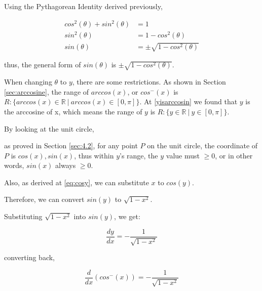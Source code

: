 \documentclass[12pt, titlepage]{article}
\begin{document}
    Using the Pythagorean Identity derived previously,
    \begin{center}
        \begin{align}
            cos^2(\theta)+sin^2(\theta)&=1\\
            sin^2(\theta)&=1-cos^2(\theta)\\
            sin(\theta)&=\pm\sqrt{1-cos^2(\theta)}
        \end{align}
    \end{center}
    thus, the general form of $sin(\theta)$ is $\pm\sqrt{1-cos^2(\theta)}$.
    
    When changing $\theta$ to $y$, there are some restrictions. As shown in Section \ref{sec:arccosine}, the range of $arccos(x)$, or $cos^-(x)$ is $R: \{arccos(x)\in\mathbb{R}\:|\:arccos(x)\in [0, \pi]\}$. At 
    \eqref{yisarccosin} we found that $y$ is the arccosine of x, which means the range of $y$ is $R: \{y\in\mathbb{R}\:|\:y\in [0, \pi]\}$.
    
    By looking at the unit circle,
    \begin{center}
    \end{center}

    as proved in Section \ref{sec:4.2}, for any point $P$ on the unit circle, the coordinate of $P$ is $cos(x), sin(x)$, thus within $y$'s range, the $y$ value must $\geq0$, or in other words, $sin(x)$ always $\geq0$.
    
    Also, as derived at \eqref{eq:cosy}, we can substitute $x$ to $cos(y)$.

    Therefore, we can convert $sin(y)$ to $\sqrt{1-x^2}$.

    Substituting $\sqrt{1-x^2}$ into $sin(y)$, we get:
    \begin{center}
        \begin{equation}
            \frac{dy}{dx} =-\frac{1}{\sqrt{1-x^2}}
        \end{equation}
    \end{center}
    converting back, 
    \begin{center}
        \begin{equation}
            \label{eq:dacos}
            \frac{d}{dx}(cos^-(x)) =-\frac{1}{\sqrt{1-x^2}}
        \end{equation}
    \end{center}
\end{document}
